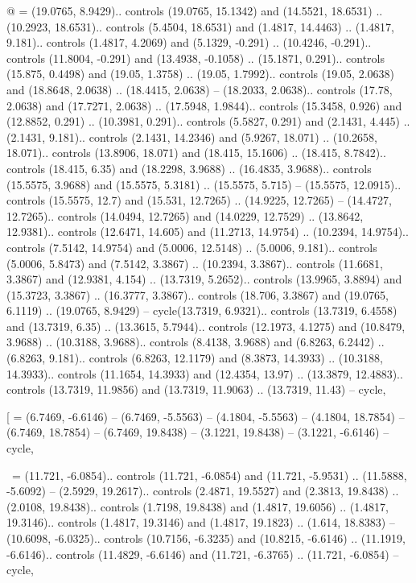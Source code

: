 @ = {(19.0765, 8.9429).. controls (19.0765, 15.1342) and (14.5521, 18.6531) .. (10.2923, 18.6531).. controls (5.4504, 18.6531) and (1.4817, 14.4463) .. (1.4817, 9.181).. controls (1.4817, 4.2069) and (5.1329, -0.291) .. (10.4246, -0.291).. controls (11.8004, -0.291) and (13.4938, -0.1058) .. (15.1871, 0.291).. controls (15.875, 0.4498) and (19.05, 1.3758) .. (19.05, 1.7992).. controls (19.05, 2.0638) and (18.8648, 2.0638) .. (18.4415, 2.0638) -- (18.2033, 2.0638).. controls (17.78, 2.0638) and (17.7271, 2.0638) .. (17.5948, 1.9844).. controls (15.3458, 0.926) and (12.8852, 0.291) .. (10.3981, 0.291).. controls (5.5827, 0.291) and (2.1431, 4.445) .. (2.1431, 9.181).. controls (2.1431, 14.2346) and (5.9267, 18.071) .. (10.2658, 18.071).. controls (13.8906, 18.071) and (18.415, 15.1606) .. (18.415, 8.7842).. controls (18.415, 6.35) and (18.2298, 3.9688) .. (16.4835, 3.9688).. controls (15.5575, 3.9688) and (15.5575, 5.3181) .. (15.5575, 5.715) -- (15.5575, 12.0915).. controls (15.5575, 12.7) and (15.531, 12.7265) .. (14.9225, 12.7265) -- (14.4727, 12.7265).. controls (14.0494, 12.7265) and (14.0229, 12.7529) .. (13.8642, 12.9381).. controls (12.6471, 14.605) and (11.2713, 14.9754) .. (10.2394, 14.9754).. controls (7.5142, 14.9754) and (5.0006, 12.5148) .. (5.0006, 9.181).. controls (5.0006, 5.8473) and (7.5142, 3.3867) .. (10.2394, 3.3867).. controls (11.6681, 3.3867) and (12.9381, 4.154) .. (13.7319, 5.2652).. controls (13.9965, 3.8894) and (15.3723, 3.3867) .. (16.3777, 3.3867).. controls (18.706, 3.3867) and (19.0765, 6.1119) .. (19.0765, 8.9429) -- cycle(13.7319, 6.9321).. controls (13.7319, 6.4558) and (13.7319, 6.35) .. (13.3615, 5.7944).. controls (12.1973, 4.1275) and (10.8479, 3.9688) .. (10.3188, 3.9688).. controls (8.4138, 3.9688) and (6.8263, 6.2442) .. (6.8263, 9.181).. controls (6.8263, 12.1179) and (8.3873, 14.3933) .. (10.3188, 14.3933).. controls (11.1654, 14.3933) and (12.4354, 13.97) .. (13.3879, 12.4883).. controls (13.7319, 11.9856) and (13.7319, 11.9063) .. (13.7319, 11.43) -- cycle},

[ = {(6.7469, -6.6146) -- (6.7469, -5.5563) -- (4.1804, -5.5563) -- (4.1804, 18.7854) -- (6.7469, 18.7854) -- (6.7469, 19.8438) -- (3.1221, 19.8438) -- (3.1221, -6.6146) -- cycle},

\ = {(11.721, -6.0854).. controls (11.721, -6.0854) and (11.721, -5.9531) .. (11.5888, -5.6092) -- (2.5929, 19.2617).. controls (2.4871, 19.5527) and (2.3813, 19.8438) .. (2.0108, 19.8438).. controls (1.7198, 19.8438) and (1.4817, 19.6056) .. (1.4817, 19.3146).. controls (1.4817, 19.3146) and (1.4817, 19.1823) .. (1.614, 18.8383) -- (10.6098, -6.0325).. controls (10.7156, -6.3235) and (10.8215, -6.6146) .. (11.1919, -6.6146).. controls (11.4829, -6.6146) and (11.721, -6.3765) .. (11.721, -6.0854) -- cycle},

